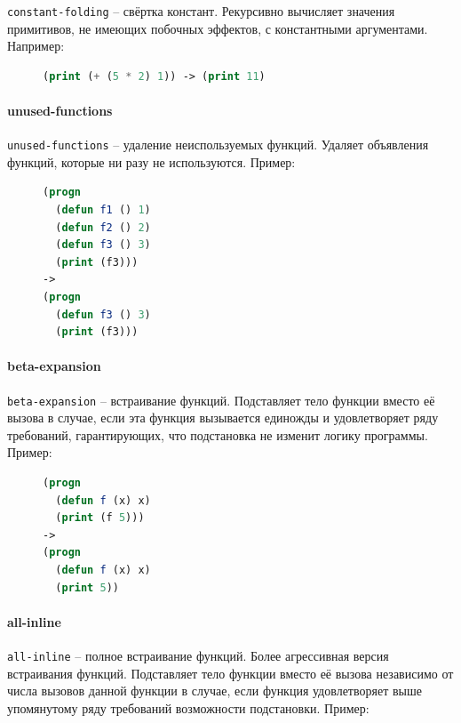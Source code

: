 \texttt{constant-folding} -- свёртка констант. Рекурсивно вычисляет значения примитивов, не имеющих побочных эффектов, с константными аргументами. Например:

\begin{figure}[H]
\begin{lstlisting}[language=Lisp]
(print (+ (5 * 2) 1)) -> (print 11)
\end{lstlisting}
\end{figure}


\paragraph{unused-functions}

\texttt{unused-functions} -- удаление неиспользуемых функций. Удаляет объявления функций, которые ни разу не используются. Пример:

\begin{figure}[H]
\begin{lstlisting}[language=Lisp]
(progn
  (defun f1 () 1)
  (defun f2 () 2)
  (defun f3 () 3)
  (print (f3)))
->
(progn
  (defun f3 () 3)
  (print (f3)))
\end{lstlisting}
\end{figure}


\paragraph{beta-expansion}

\texttt{beta-expansion} -- встраивание функций. Подставляет тело функции вместо её вызова в случае, если эта функция вызывается единожды и удовлетворяет ряду требований, гарантирующих, что подстановка не изменит логику программы. Пример:

\begin{figure}[H]
\begin{lstlisting}[language=Lisp]
(progn
  (defun f (x) x)
  (print (f 5)))
->
(progn
  (defun f (x) x)
  (print 5))
\end{lstlisting}
\end{figure}


\paragraph{all-inline}

\texttt{all-inline} -- полное встраивание функций. Более агрессивная версия встраивания функций. Подставляет тело функции вместо её вызова независимо от числа вызовов данной функции в случае, если функция удовлетворяет выше упомянутому ряду требований возможности подстановки. Пример:

